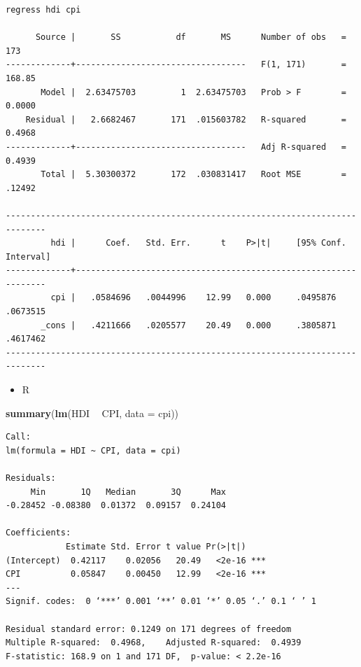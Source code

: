 \documentclass[]{book}
\newenvironment{Shaded}{\begin{snugshade}}{\end{snugshade}}
\newcommand{\KeywordTok}[1]{\textcolor[rgb]{0.13,0.29,0.53}{\textbf{#1}}}
\newcommand{\DataTypeTok}[1]{\textcolor[rgb]{0.13,0.29,0.53}{#1}}
\newcommand{\StringTok}[1]{\textcolor[rgb]{0.31,0.60,0.02}{#1}}
\newcommand{\OperatorTok}[1]{\textcolor[rgb]{0.81,0.36,0.00}{\textbf{#1}}}
\newcommand{\NormalTok}[1]{#1}
\providecommand{\tightlist}{%
  \setlength{\itemsep}{0pt}\setlength{\parskip}{0pt}}
\begin{document}
\begin{verbatim}
regress hdi cpi

      Source |       SS           df       MS      Number of obs   =       173
-------------+----------------------------------   F(1, 171)       =    168.85
       Model |  2.63475703         1  2.63475703   Prob > F        =    0.0000
    Residual |   2.6682467       171  .015603782   R-squared       =    0.4968
-------------+----------------------------------   Adj R-squared   =    0.4939
       Total |  5.30300372       172  .030831417   Root MSE        =    .12492

------------------------------------------------------------------------------
         hdi |      Coef.   Std. Err.      t    P>|t|     [95% Conf. Interval]
-------------+----------------------------------------------------------------
         cpi |   .0584696   .0044996    12.99   0.000     .0495876    .0673515
       _cons |   .4211666   .0205577    20.49   0.000     .3805871    .4617462
------------------------------------------------------------------------------
\end{verbatim}

\begin{itemize}
\tightlist
\item
  R
\end{itemize}

\begin{Shaded}
\begin{Highlighting}[]
\KeywordTok{summary}\NormalTok{(}\KeywordTok{lm}\NormalTok{(HDI }\OperatorTok{~}\StringTok{ }\NormalTok{CPI, }\DataTypeTok{data =}\NormalTok{ cpi))}
\end{Highlighting}
\end{Shaded}

\begin{verbatim}
Call:
lm(formula = HDI ~ CPI, data = cpi)

Residuals:
     Min       1Q   Median       3Q      Max 
-0.28452 -0.08380  0.01372  0.09157  0.24104 

Coefficients:
            Estimate Std. Error t value Pr(>|t|)    
(Intercept)  0.42117    0.02056   20.49   <2e-16 ***
CPI          0.05847    0.00450   12.99   <2e-16 ***
---
Signif. codes:  0 ‘***’ 0.001 ‘**’ 0.01 ‘*’ 0.05 ‘.’ 0.1 ‘ ’ 1

Residual standard error: 0.1249 on 171 degrees of freedom
Multiple R-squared:  0.4968,    Adjusted R-squared:  0.4939 
F-statistic: 168.9 on 1 and 171 DF,  p-value: < 2.2e-16
\end{verbatim}
\end{document}
